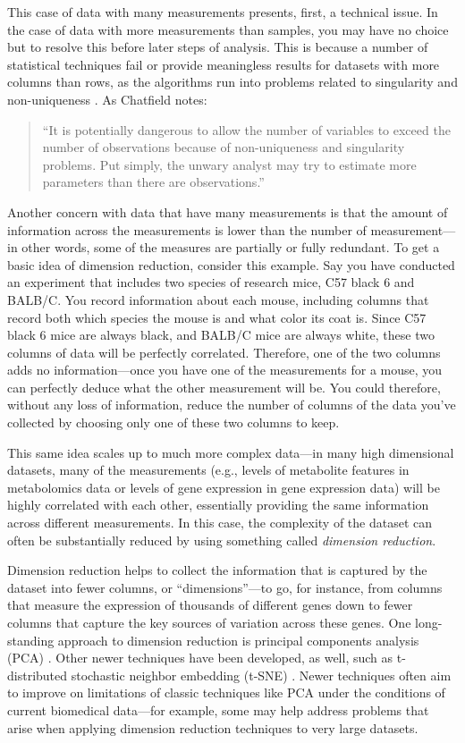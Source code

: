 \documentclass[]{tufte-book}
\begin{document}
This case of data with many measurements presents, first, a technical issue. In
the case of data with more measurements than samples, you may have no choice but
to resolve this before later steps of analysis. This is because a number of
statistical techniques fail or provide meaningless results for datasets with
more columns than rows, as the algorithms run into problems
related to singularity and non-uniqueness \citep{chatfield1995problem}. As Chatfield
notes:

\begin{quote}
``It is potentially dangerous to allow the number of variables to exceed the
number of observations because of non-uniqueness and singularity problems. Put
simply, the unwary analyst may try to estimate more parameters than there are
observations.'' \citep{chatfield1995problem}
\end{quote}

Another concern with data that have many measurements is that
the amount of information across the measurements is lower than the number of
measurement---in other words, some of the measures are partially or fully
redundant. To get a basic idea of dimension reduction, consider this example.
Say you have conducted an experiment that includes two species of research mice,
C57 black 6 and BALB/C. You record information about each mouse, including
columns that record both which species the mouse is and what color its coat is.
Since C57 black 6 mice are always black, and BALB/C mice are always white, these
two columns of data will be perfectly correlated. Therefore, one of the two
columns adds no information---once you have one of the measurements for a mouse,
you can perfectly deduce what the other measurement will be. You could
therefore, without any loss of information, reduce the number of
columns of the data you've collected by choosing only one of these
two columns to keep.

This same idea scales up to much more complex data---in many high dimensional
datasets, many of the measurements (e.g., levels of metabolite features in
metabolomics data or levels of gene expression in gene expression data) will be
highly correlated with each other, essentially providing the same information
across different measurements. In this case, the complexity of the dataset can
often be substantially reduced by using something called \emph{dimension reduction}.

Dimension reduction helps to collect the information that is captured by the
dataset into fewer columns, or ``dimensions''---to go, for instance, from columns
that measure the expression of thousands of different genes down to fewer
columns that capture the key sources of variation across these genes. One
long-standing approach to dimension reduction is principal components analysis
(PCA) \citep{haque2017practical}. Other newer techniques have been developed, as
well, such as t-distributed stochastic neighbor embedding (t-SNE)
\citep{perkel2017single}. Newer techniques often aim to improve on limitations of
classic techniques like PCA under the conditions of current biomedical
data---for example, some may help address problems that arise when applying
dimension reduction techniques to very large datasets.
\end{document}
